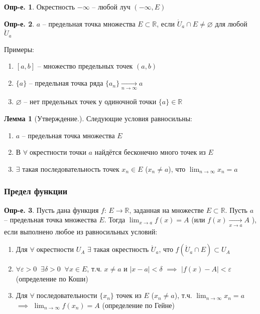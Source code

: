 \documentclass[a4paper,12pt]{article}
\numberwithin{figure}{section}
\theoremstyle{definition}
\newtheorem{definition}{Опр-е.}[section]
\theoremstyle{definition}
\newtheorem{lemma}{Лемма}[section]
\def\DS{\displaystyle}
\def\RR{\mathbb{R}}
\def\.{\;\;}
\def\eps{\varepsilon}
\def\ntoinf{n\to\infty}
\def\ringU{\mathring{U}}
\def\any{$\forall\;$}
\begin{document}
\begin{definition} Окрестность $-\infty$ -- любой луч $(-\infty,E)$ \end{definition}
\bigskip

\begin{definition}
	$a$ -- предельная точка множества $E \subset \RR$,
	если $\ringU_a \cap E \neq \varnothing$ для любой $\ringU_a$
\end{definition}

\bigbreak
Примеры:\begin{enumerate}
	\item $[a,b]$ -- множество предельных точек $(a,b)$
	\item $\{a\}$ -- предельная точка ряда $\{a_n\}\xrightarrow[\ntoinf]{}a$
	\item $\varnothing$ -- нет предельных точек у одиночной точки $\{a\} \in \RR$
\end{enumerate}
\bigskip

\begin{lemma}[Утверждение.]
  Следующие условия равносильны:
  \begin{enumerate}
	\item $a$ -- предельная точка множества $E$
	\item В \any окрестности точки $a$ найдётся бесконечно много точек из $E$
	\item $\exists$ такая последовательность точек $x_n \in E$ ($x_n \neq a$),
		  что $\DS \lim_{\ntoinf}x_n=a$
  \end{enumerate}
\end{lemma}

\subsubsection{Предел функции}

\begin{definition}
	Пусть дана функция $f$: $E\to\RR$, заданная на множестве $E \subset \RR$.
	Пусть $a$ -- предельная точка множества $E$.
	Тогда $\DS \lim_{x \to a}f(x)=A$
	\big(или $f(x) \xrightarrow[x \to a]{} A$ \big),
	если выполнено любое из равносильных условий:
	\begin{enumerate}
		\item Для \any окрестности $U_A$ $\exists$ такая окрестность $\ringU_a$,
			  что $f(\ringU_a \cap E) \subset U_A$
		\item $\forall \eps>0 \. \exists \delta>0 \. \forall x \in E$,
			  т.ч. $x \ne a$ и $|x-a|<\delta$
			  $\implies$ $\left|f(x)-A\right|<\eps$
			  (определение по Коши)
		\item Для \any последовательности $\{x_n\}$ точек из $E$ ($x_n\ne a$),
			  т.ч. $\DS \lim_{\ntoinf}x_n = a$
			  $\implies$ $\DS \lim_{\ntoinf}f(x_n) = A$
			  (определение по Гейне)
	\end{enumerate}
\end{definition}
\bigskip
\end{document}
